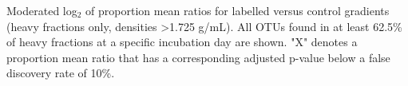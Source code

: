 Moderated log$_{2}$ of proportion mean ratios for labelled versus control gradients (heavy fractions only, densities >1.725 g/mL). All OTUs found in at least 62.5\% of heavy fractions at a specific incubation day are shown. "X" denotes a proportion mean ratio that has a corresponding adjusted p-value below a false discovery rate of 10\%. 